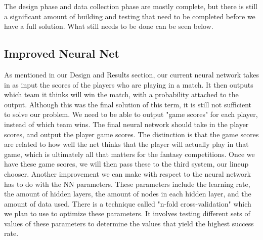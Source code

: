 
The design phase and data collection phase are mostly complete, but there is still a significant amount of building and testing that need to be completed before we have a full solution. What still needs to be done can be seen below.

\subsection{Improved Neural Net}
As mentioned in our Design and Results section, our current neural network takes in as input the scores of the players who are playing in a match. It then outputs which team it thinks will win the match, with a probability attached to the output. Although this was the final solution of this term, it is still not sufficient to solve our problem. We need to be able to output "game scores" for each player, instead of which team wins. The final neural network should take in the player scores, and output the player game scores. The distinction is that the game scores are related to how well the net thinks that the player will actually play in that game, which is ultimately all that matters for the fantasy competitions. Once we have these game scores, we will then pass these to the third system, our lineup chooser.
Another improvement we can make with respect to the neural network has to do with the NN parameters. These parameters include the learning rate, the amount of hidden layers, the amount of nodes in each hidden layer, and the amount of data used. There is a technique called "n-fold cross-validation" which we plan to use to optimize these parameters. It involves testing different sets of values of these parameters to determine the values that yield the highest success rate.

